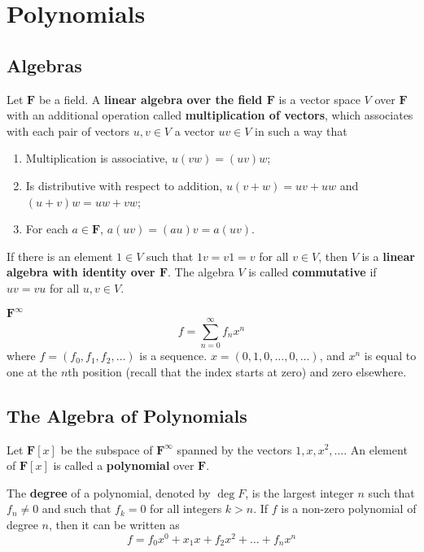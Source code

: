 \chapter{Polynomials}

\section{Algebras}

\begin{definition}
	Let $\textbf{F}$ be a field. A \textbf{linear algebra over the field $\textbf{F}$} is a vector space $V$ over $\textbf{F}$ with an additional operation called \textbf{multiplication of vectors}, which associates with each pair of vectors $u, v \in V$ a vector $uv \in V$ in such a way that 
	\begin{enumerate}
		\item Multiplication is associative, $u(vw) = (uv)w$;
		\item Is distributive with respect to addition, $u(v+w) = uv + uw$ and $(u+v)w = uw + vw$;
		\item For each $a \in \textbf{F}$, $a(uv) = (au)v = a(uv)$.
	\end{enumerate}
	
	If there is an element $1 \in V$ such that $1v = v1 = v$ for all $v \in V$, then $V$ is a \textbf{linear algebra with identity over $\textbf{F}$}. The algebra $V$ is called \textbf{commutative} if $uv = vu$ for all $u,v \in V$.
\end{definition}

\begin{example}
	$\textbf{F}^\infty$
	\[
		f = \sum_{n=0}^\infty f_n x^n
	\]
	where $f = (f_0, f_1, f_2, \ldots)$ is a sequence. $x = (0,1,0,\ldots,0,\ldots)$, and $x^n$ is equal to one at the $n$th position (recall that the index starts at zero) and zero elsewhere. 
\end{example}

\section{The Algebra of Polynomials}

\begin{definition}[Polynomial]
	Let $\textbf{F}[x]$ be the subspace of $\textbf{F}^\infty$ spanned by the vectors $1, x, x^2, \ldots$. An element of $\textbf{F}[x]$ is called a \textbf{polynomial} over $\textbf{F}$.
	
	The \textbf{degree} of a polynomial, denoted by $\deg F$, is the largest integer $n$ such that $f_n \neq 0$ and such that $f_k = 0$ for all integers $k > n$. If $f$ is a non-zero polynomial of degree $n$, then it can be written as
	\[
		f = f_0 x^0 + x_1 x + f_2 x^2 + \ldots + f_n x^n
	\]
\end{definition}

